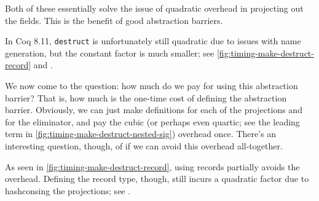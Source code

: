   Both of these essentially solve the issue of quadratic overhead in projecting out the fields.
  This is the benefit of good abstraction barriers.

  In Coq 8.11, \texttt{destruct} is unfortunately still quadratic due to issues with name generation, but the constant factor is much smaller; see \autoref{fig:timing-make-destruct-record} and .

  We now come to the question: how much do we pay for using this abstraction barrier?
  That is, how much is the one-time cost of defining the abstraction barrier.
  Obviously, we can just make definitions for each of the projections and for the eliminator, and pay the cubic (or perhaps even quartic; see the leading term in \autoref{fig:timing-make-destruct-nested-sig}) overhead once.
  There's an interesting question, though, of if we can avoid this overhead all-together.

  As seen in \autoref{fig:timing-make-destruct-record}, using records partially avoids the overhead.
  Defining the record type, though, still incurs a quadratic factor due to hashconsing the projections; see .

